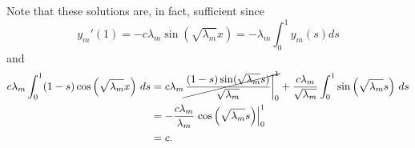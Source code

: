 \documentclass{homework}
\begin{document}
\begin{solution}
Note that these solutions are, in fact, sufficient since
$$
y_m'(1) = - c \lambda_m \sin \left(\sqrt{\lambda_m} x\right) = -\lambda_m \int_0^1 y_m(s)ds
$$
and 
\begin{align*}
c \lambda_m\int_0^1(1-s)\cos\left(\sqrt{\lambda_m} x\right)\,ds 
&= c\lambda_m\cancel{ \left. \frac{(1-s) \sin(\sqrt{\lambda_m} s)}{\sqrt{\lambda_m}}\right|_0^1} + \frac{c\lambda_m}{\sqrt{\lambda_m}} \int_0^1 \sin\left(\sqrt{\lambda_m} s\right)\,ds\\
&=  -\frac{c\lambda_m}{\lambda_m} \left.\cos\left(\sqrt{\lambda_m} s\right)\right|_0^1\\
&=  c.
\end{align*}
\end{solution}
\end{document}
